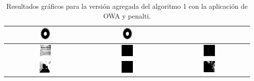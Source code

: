 \documentclass[main]{subfiles}
\begin{document}
\begin{table}
\begin{tabular}{c|c|c}
\includegraphics[width=0.15\textwidth]{img/res/e6/alg1agregadoowa202.jpg} &
\includegraphics[width=0.15\textwidth]{img/res/e6/alg1agregadoowa302.jpg} \\\hline
\includegraphics[width=0.15\textwidth]{img/res/e6/alg1agregadoowa109.jpg} &
\includegraphics[width=0.15\textwidth]{img/res/e6/alg1agregadoowa209.jpg} &
\includegraphics[width=0.15\textwidth]{img/res/e6/alg1agregadoowa309.jpg} \\\hline
\includegraphics[width=0.15\textwidth]{img/res/e6/alg1agregadoowa107.jpg} &
\includegraphics[width=0.15\textwidth]{img/res/e6/alg1agregadoowa207.jpg} &
\includegraphics[width=0.15\textwidth]{img/res/e6/alg1agregadoowa307.jpg} \\\hline
\end{tabular}
\caption{Resultados gráficos para la versión agregada del algoritmo 1 con la aplicación de OWA y penalti. \label{tab:resultexp6imagenes}}
\end{table}
\end{document}
